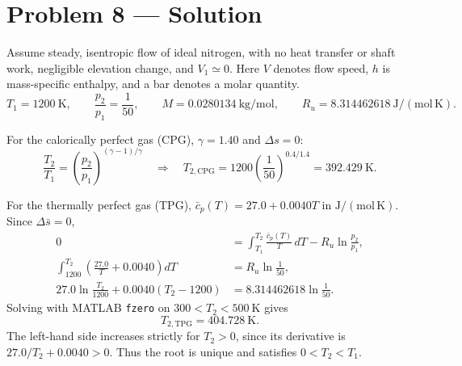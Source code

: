 \section*{Problem 8 --- Solution}

Assume steady, isentropic flow of ideal nitrogen, with no heat transfer or shaft work,
negligible elevation change, and $V_1\simeq0$. Here $V$ denotes flow speed,
$h$ is mass-specific enthalpy, and a bar denotes a molar quantity.
\[
T_1=1200\ \mathrm{K},\qquad \frac{p_2}{p_1}=\frac{1}{50},\qquad
M=0.0280134\ \mathrm{kg/mol},\qquad
R_u=8.314462618\ \mathrm{J/(mol\,K)}.
\]

For the calorically perfect gas (CPG), $\gamma=1.40$ and $\Delta s=0$:
\[
\frac{T_2}{T_1}=\left(\frac{p_2}{p_1}\right)^{(\gamma-1)/\gamma}
\quad\Longrightarrow\quad
\boxed{T_{2,\mathrm{CPG}}=1200\left(\frac{1}{50}\right)^{0.4/1.4}
=392.429\ \mathrm{K}}.
\]

For the thermally perfect gas (TPG), $\bar c_p(T)=27.0+0.0040T$
in $\mathrm{J/(mol\,K)}$. Since $\Delta\bar s=0$,
\begin{align*}
0&=\int_{T_1}^{T_2}\frac{\bar c_p(T)}{T}\,dT-R_u\ln\frac{p_2}{p_1},\\
\int_{1200}^{T_2}\left(\frac{27.0}{T}+0.0040\right)dT
&=R_u\ln\frac{1}{50},\\
27.0\ln\frac{T_2}{1200}+0.0040(T_2-1200)
&=8.314462618\ln\frac{1}{50}.
\end{align*}
Solving with MATLAB \texttt{fzero} on $300<T_2<500\ \mathrm{K}$ gives
\[
\boxed{T_{2,\mathrm{TPG}}=404.728\ \mathrm{K}}.
\]
The left-hand side increases strictly for $T_2>0$, since its derivative is
$27.0/T_2+0.0040>0$. Thus the root is unique and satisfies $0<T_2<T_1$.

